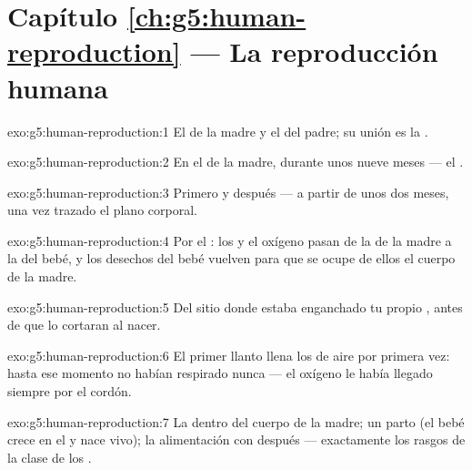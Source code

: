 \section*{Capítulo \ref{ch:g5:human-reproduction} --- La reproducción humana}

\begin{solution}{exo:g5:human-reproduction:1}
El  de la madre y el  del padre; su unión es la
.
\end{solution}

\begin{solution}{exo:g5:human-reproduction:2}
En el  de la madre, durante unos nueve meses --- el .
\end{solution}

\begin{solution}{exo:g5:human-reproduction:3}
Primero  y después  --- a partir de unos dos meses, una vez
trazado el plano corporal.
\end{solution}

\begin{solution}{exo:g5:human-reproduction:4}
Por el : los  y el oxígeno pasan de la
 de la madre a la del bebé, y los desechos del bebé vuelven para
que se ocupe de ellos el cuerpo de la madre.
\end{solution}

\begin{solution}{exo:g5:human-reproduction:5}
Del sitio donde estaba enganchado tu propio , antes de
que lo cortaran al nacer.
\end{solution}

\begin{solution}{exo:g5:human-reproduction:6}
El primer llanto llena los  de aire por primera vez: hasta ese
momento no habían respirado nunca --- el oxígeno le había llegado
siempre por el cordón.
\end{solution}

\begin{solution}{exo:g5:human-reproduction:7}
La  dentro del cuerpo de la madre; un parto  (el
bebé crece en el  y nace vivo); la alimentación con  después
--- exactamente los rasgos de la clase de los .
\end{solution}

